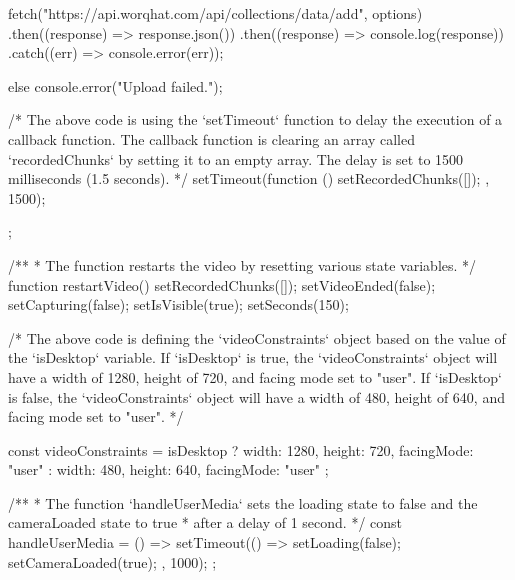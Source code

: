 {{{{{            fetch("https://api.worqhat.com/api/collections/data/add", options)
              .then((response) => response.json())
              .then((response) => console.log(response))
              .catch((err) => console.error(err));
          }

        } else {
          console.error("Upload failed.");
        }

      /* The above code is using the `setTimeout` function to delay the execution of a callback function. The
callback function is clearing an array called `recordedChunks` by setting it to an empty array. The
delay is set to 1500 milliseconds (1.5 seconds). */
      setTimeout(function () {
        setRecordedChunks([]);
      }, 1500);
    }
  };

  /**
   * The function restarts the video by resetting various state variables.
   */
  function restartVideo() {
    setRecordedChunks([]);
    setVideoEnded(false);
    setCapturing(false);
    setIsVisible(true);
    setSeconds(150);
  }

  /* The above code is defining the `videoConstraints` object based on the value of the `isDesktop`
variable. If `isDesktop` is true, the `videoConstraints` object will have a width of 1280, height of
720, and facing mode set to "user". If `isDesktop` is false, the `videoConstraints` object will have
a width of 480, height of 640, and facing mode set to "user". */

  const videoConstraints = isDesktop
    ? { width: 1280, height: 720, facingMode: "user" }
    : { width: 480, height: 640, facingMode: "user" };

  /**
   * The function `handleUserMedia` sets the loading state to false and the cameraLoaded state to true
   * after a delay of 1 second.
   */
  const handleUserMedia = () => {
    setTimeout(() => {
      setLoading(false);
      setCameraLoaded(true);
    }, 1000);
  };

}
